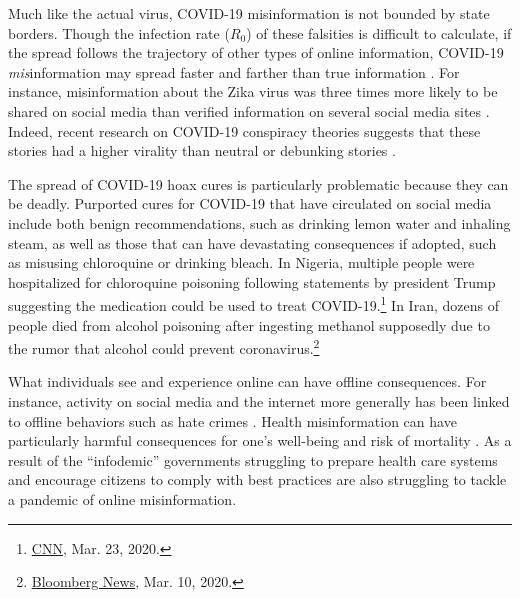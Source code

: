 \documentclass[letterpaper, 12pt, parskip=full,]{scrartcl}
\begin{document}
Much like the actual virus, COVID-19 misinformation is not bounded by state borders. Though the infection rate ($R_0$) of these falsities is difficult to calculate, if the spread follows the trajectory of other types of online information, COVID-19 \textit{mis}information may spread faster and farther than true information \citep{vosoughi2018spread}. For instance, misinformation about the Zika virus was three times more likely to be shared on social media than verified information on several social media sites \citep{sharma2017zika}. Indeed, recent research on COVID-19 conspiracy theories suggests that these stories had a higher virality than neutral or debunking stories \citep{HKS_whatsapp}. %
 

The spread of COVID-19 hoax cures is particularly problematic because they can be deadly. Purported cures for COVID-19 that have circulated on social media include both benign recommendations, such as drinking lemon water and inhaling steam, as well as those that can have devastating consequences if adopted, such as misusing chloroquine or drinking bleach. In Nigeria, multiple people were hospitalized for chloroquine poisoning following statements by president Trump suggesting the medication could be used to treat COVID-19.\footnote{\href{https://www.cnn.com/2020/03/23/africa/chloroquine-trump-nigeria-intl/index.html}{CNN}, Mar. 23, 2020.}  In Iran, dozens of people died from alcohol poisoning after ingesting methanol supposedly due to the rumor that alcohol could prevent coronavirus.\footnote{\href{https://nationalpost.com/news/world/rumours-that-alcohol-kills-covid-19-leaves-21-iranians-dead-from-poisoning}{Bloomberg News}, Mar. 10, 2020.}

What individuals see and experience online can have offline consequences. For instance, activity on social media and the internet more generally has been linked to offline behaviors such as hate crimes \citep{muller2019fanning, chan2016internet}. Health misinformation can have particularly harmful consequences for one's well-being and risk of mortality \citep{swire2020public}. As a result of the ``infodemic'' governments struggling to prepare health care systems and encourage citizens to comply with best practices are also struggling to tackle a pandemic of online misinformation.
\end{document}
